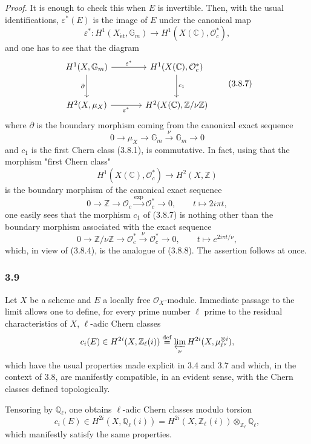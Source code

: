 \documentclass[11pt]{article}
\providecommand{\et}{\mathrm{\acute{e}t}}
\providecommand{\et}{\acute{e}t}
\begin{document}
\emph{Proof.} It is enough to check this when $E$ is invertible. Then, with the usual identifications, $\varepsilon^*(E)$ is the image of $E$ under the canonical map
\[
\varepsilon^*:H^1(X_{\et},\mathbb G_m)\to H^1(X(\mathbb C),\mathcal O_c^*),
\tag{3.8.6}
\]
and one has to see that the diagram
\[
\begin{tikzcd}[column sep=large,row sep=large]
H^1(X,\mathbb G_m) \arrow[r,"\varepsilon^*"] \arrow[d,"\partial"'] &
H^1(X(\mathbb C),\mathcal O_c^*) \arrow[d,"c_1"]\\
H^2(X,\mu_X) \arrow[r,"\varepsilon^*"'] &
H^2(X(\mathbb C),\mathbb Z/\nu\mathbb Z)
\end{tikzcd}
\tag{3.8.7}
\]
where $\partial$ is the boundary morphism coming from the canonical exact sequence
\[
0\to \mu_X\to\mathbb G_m\xrightarrow{\nu}\mathbb G_m\to0
\tag{3.8.8}
\]
and $c_1$ is the first Chern class (3.8.1), is commutative. In fact, using that the morphism "first Chern class"
\[
H^1(X(\mathbb C),\mathcal O_c^*)\to H^2(X,\mathbb Z)
\]
is the boundary morphism of the canonical exact sequence
\[
0\to\mathbb Z\to\mathcal O_c\xrightarrow{\exp}\mathcal O_c^*\to0,
\qquad
t\mapsto 2i\pi t,
\]
one easily sees that the morphism $c_1$ of (3.8.7) is nothing other than the boundary morphism associated with the exact sequence
\[
0\to\mathbb Z/\nu\mathbb Z\to\mathcal O_c^*\xrightarrow{\nu}\mathcal O_c^*\to0,
\qquad
t\mapsto e^{2i\pi t/\nu},
\]
which, in view of (3.8.4), is the analogue of (3.8.8). The assertion follows at once.

\subsubsection*{3.9}
Let $X$ be a scheme and $E$ a locally free $\mathcal O_X$-module. Immediate passage to the limit allows one to define, for every prime number $\ell$ prime to the residual characteristics of $X$, $\ell$-adic Chern classes
\[
c_i(E)\in H^{2i}(X,\mathbb Z_\ell(i))
\stackrel{\mathrm{def}}{=}\varprojlim_\nu H^{2i}(X,\mu_{\ell^\nu}^{\otimes i}),
\]
which have the usual properties made explicit in 3.4 and 3.7 and which, in the context of 3.8, are manifestly compatible, in an evident sense, with the Chern classes defined topologically.

Tensoring by $\mathbb Q_\ell$, one obtains $\ell$-adic Chern classes modulo torsion
\[
c_i(E)\in H^{2i}(X,\mathbb Q_\ell(i))
=H^{2i}(X,\mathbb Z_\ell(i))\otimes_{\mathbb Z_\ell}\mathbb Q_\ell,
\]
which manifestly satisfy the same properties.
\end{document}
